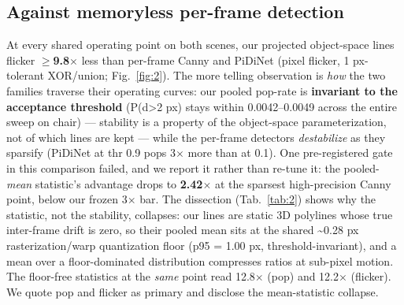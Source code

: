 \subsection{Against memoryless per-frame detection}
At every shared operating point on both scenes, our projected object-space lines flicker
\textbf{$\geq$9.8$\times$} less than per-frame Canny and PiDiNet (pixel flicker, 1 px-tolerant XOR/union;
Fig.~\ref{fig:2}). The more telling observation is \emph{how} the two families traverse their operating
curves: our pooled pop-rate is \textbf{invariant to the acceptance threshold} (P(d>2 px) stays
within 0.0042--0.0049 across the entire sweep on chair) --- stability is a property of the
object-space parameterization, not of which lines are kept --- while the per-frame
detectors \emph{destabilize} as they sparsify (PiDiNet at thr 0.9 pops 3$\times$ more than at 0.1).
One pre-registered gate in this comparison failed, and we report it rather than re-tune
it: the pooled-\emph{mean} statistic's advantage drops to \textbf{2.42$\times$} at the sparsest
high-precision Canny point, below our frozen 3$\times$ bar. The dissection (Tab.~\ref{tab:2}) shows why the
statistic, not the stability, collapses: our lines are static 3D polylines whose true
inter-frame drift is zero, so their pooled mean sits at the shared \textasciitilde{}0.28 px
rasterization/warp quantization floor (p95 = 1.00 px, threshold-invariant), and a mean
over a floor-dominated distribution compresses ratios at sub-pixel motion. The floor-free
statistics at the \emph{same} point read 12.8$\times$ (pop) and 12.2$\times$ (flicker). We quote pop and
flicker as primary and disclose the mean-statistic collapse.

